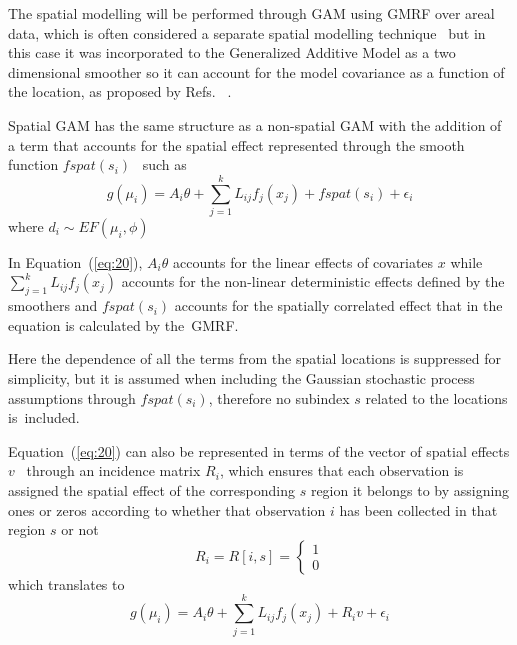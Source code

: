 \documentclass[energies,article,accept,pdftex,moreauthors]{Definitions/mdpi}
\begin{document}
     
     The spatial modelling will be performed through GAM using GMRF over areal data, which is often considered a separate spatial modelling technique~\citep{StockWhatRisk} but in this case it was incorporated to the Generalized Additive Model  as a two dimensional smoother so it can account for the model covariance as a function of the location, as proposed by Refs.  ~\citep{Fahrmeir2011BayesianData,Wood2017GeneralizedR}. 
     
     
     Spatial GAM has the same structure as a non-spatial GAM with the addition of a term that accounts for the spatial effect represented through the smooth function $fspat(s_i)$~\citep{Fahrmeir2011BayesianData} such as
\begin{equation}\label{eq:20}
        g(\mu_i)=A_i\theta+\sum_{j=1}^{k}L_{ij}f_j(x_j)+fspat(s_i)+\epsilon_i
     \end{equation}
    where \(d_i \sim EF(\mu_i,\phi)\)
    
    In Equation~(\ref{eq:20}), $A_i\theta$ accounts for the linear effects of covariates $x$ while \(\sum_{j=1}^{k}L_{ij}f_j(x_j)\) accounts for the non-linear deterministic effects defined by the smoothers and $fspat(s_i)$ accounts for the spatially correlated effect that in the equation is calculated by the~GMRF. %
    
    
    Here the dependence of all the terms from the spatial locations is suppressed for simplicity, but it is assumed when including the Gaussian stochastic process assumptions through $fspat(s_i)$, therefore no subindex $s$  related to the locations is~included.
    
    Equation~(\ref{eq:20}) can also be represented in terms of the vector of spatial effects $v$~\citep{Fahrmeir2011BayesianData} through an incidence matrix $R_{i}$, which ensures that each observation is assigned the spatial effect of the corresponding $s$ region it belongs to by assigning ones or zeros according to whether that observation $i$ has been collected in that region $s$ or not
\begin{equation}
        R_i=R[i,s]=
    \begin{cases}
    1 \\
    0
    \end{cases}
    \end{equation}
which translates to
\begin{equation}\label{eq:22}
        g(\mu_i)=A_i\theta+ \sum_{j=1}^{k}L_{ij}f_j(x_j)+R_iv+\epsilon_i
    \end{equation}
    
\end{document}
